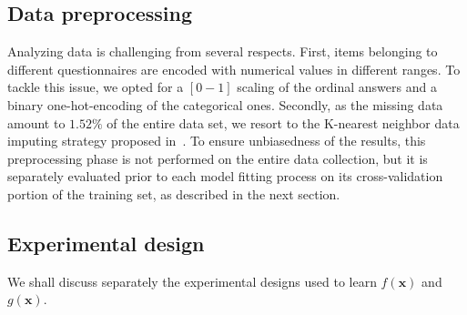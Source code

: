\subsection{Data preprocessing}
Analyzing \PCO data is challenging from several respects.
First, items belonging to different questionnaires are encoded with numerical values in different ranges.
To tackle this issue, we opted for a $[0-1]$ scaling of the ordinal answers and a binary one-hot-encoding of the categorical ones.
Secondly, as the missing data amount to $1.52\%$ of the entire data set, we resort to the K-nearest neighbor data imputing strategy proposed in~\cite{troyanskaya2001missing}.
To ensure unbiasedness of the results, this preprocessing phase is not performed on the entire data collection, but it is separately evaluated prior to each model fitting process on its cross-validation portion of the training set, as described in the next section.


\subsection{Experimental design}\label{sec:experimental_design}

We shall discuss separately the experimental designs used to learn $f(\bm{x})$ and $g(\bm{x})$.


